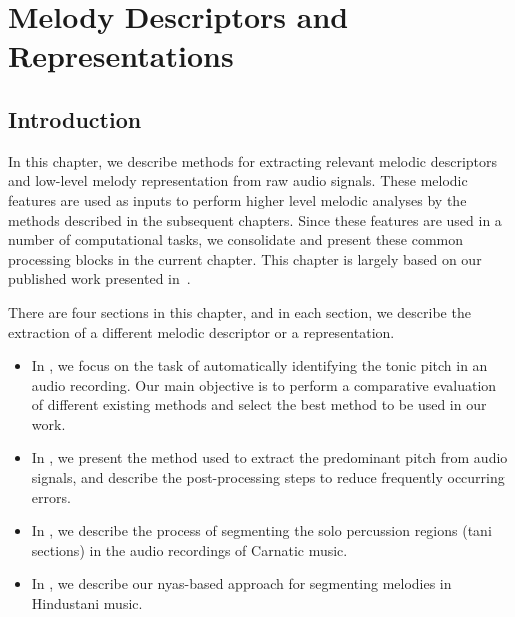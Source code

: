 
\chapter{Melody Descriptors and Representations}
\label{chap:data_preprocessing}

\section{Introduction}
\label{sec:data_preprocessing_intro}

In this chapter, we describe methods for extracting relevant melodic descriptors and low-level melody representation from raw audio signals.  These melodic features are used as inputs to perform higher level melodic analyses by the methods described in the subsequent chapters. Since these features are used in a number of computational tasks, we consolidate and present these common processing blocks in the current chapter. This chapter is largely based on our published work presented in~\cite{Gulati2014Tonic,gulati2014Landmark,gulati_SITIS_2014}.

There are four sections in this chapter, and in each section, we describe the extraction of a different melodic descriptor or a representation.
\begin{itemize}
	\item In , we focus on the task of automatically identifying the tonic pitch in an audio recording. Our main objective is to perform a comparative evaluation of different existing methods and select the best method to be used in our work.
	\item In , we present the method used to extract the predominant pitch from audio signals, and describe the post-processing steps to reduce frequently occurring errors.
	\item In , we describe the process of segmenting the solo percussion regions (\Gls{tani} sections) in the audio recordings of Carnatic music.  
	\item In , we describe our \gls{nyas}-based approach for segmenting melodies in Hindustani music. 	
\end{itemize}
	

